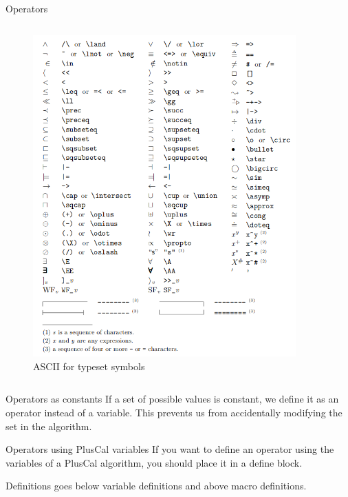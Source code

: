 \documentclass[10pt]{beamer}
\begin{document}
\begin{frame}{Operators}
\begin{columns}[T,onlytextwidth]
\begin{figure}
        \includegraphics[width=0.9\textwidth]{figures/ascii-for-typeset-symbols.png}
        \caption{ASCII for typeset symbols}
      \end{figure}
  \end{columns}
  
  \framebreak

  \begin{exampleblock}{Operators as constants}
    If a set of possible values is constant, we define it as an operator instead of a variable. This prevents us from accidentally modifying the set in the algorithm.
  \end{exampleblock}
  
  \constantsWithOperatorsSample

  \begin{exampleblock}{Operators using PlusCal variables}
    If you want to define an operator using the variables of a PlusCal algorithm, you should place it in a \alert{define} block.
  \end{exampleblock}

  Definitions goes below variable definitions and above macro definitions.
  
  \operatorsWithPlusCalVariablesSample
  
\end{frame}
\end{document}
